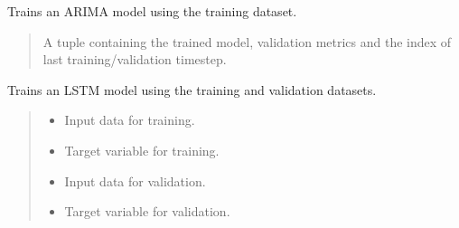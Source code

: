 \documentclass[letterpaper,10pt,english]{sphinxmanual}
\begin{document}
\begin{fulllineitems}
\begin{fulllineitems}
\label{\detokenize{docs/training_module:training_module.ModelTraining.train_ARIMA_model}}
\pysigstartsignatures
{}
\pysigstopsignatures
\sphinxAtStartPar
Trains an ARIMA model using the training dataset.
\begin{quote}\begin{description}
\sphinxAtStartPar
A tuple containing the trained model, validation metrics and the index of last training/validation timestep.

\end{description}\end{quote}

\end{fulllineitems}


\begin{fulllineitems}
\label{\detokenize{docs/training_module:training_module.ModelTraining.train_LSTM_model}}
\pysigstartsignatures
{}
\pysigstopsignatures
\sphinxAtStartPar
Trains an LSTM model using the training and validation datasets.
\begin{quote}\begin{description}
\begin{itemize}
\item {} 
\sphinxAtStartPar
{} \textendash{} Input data for training.

\item {} 
\sphinxAtStartPar
{} \textendash{} Target variable for training.

\item {} 
\sphinxAtStartPar
{} \textendash{} Input data for validation.

\item {} 
\sphinxAtStartPar
{} \textendash{} Target variable for validation.


\end{itemize}
\end{description}
\end{quote}
\end{fulllineitems}
\end{fulllineitems}
\end{document}
